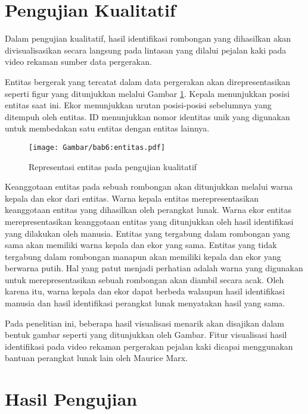 \section{Pengujian Kualitatif}
\label{sec:qualitative}

Dalam pengujian kualitatif, hasil identifikasi rombongan yang dihasilkan akan divisualisasikan secara langsung pada lintasan yang dilalui pejalan kaki pada video rekaman sumber data pergerakan.

Entitas bergerak yang tercatat dalam data pergerakan akan direpresentasikan seperti figur yang ditunjukkan melalui Gambar \ref{bab6:representasi-entitas}. Kepala menunjukkan posisi entitas saat ini. Ekor menunjukkan urutan posisi-posisi sebelumnya yang ditempuh oleh entitas. ID menunjukkan nomor identitas unik yang digunakan untuk membedakan satu entitas dengan entitas lainnya.

\begin{figure}[t]
    \centering
    \texttt{[image: Gambar/bab6:entitas.pdf]}
    \caption{Representasi entitas pada pengujian kualitatif}
    \label{bab6:representasi-entitas}
\end{figure}

Keanggotaan entitas pada sebuah rombongan akan ditunjukkan melalui warna kepala dan ekor dari entitas. Warna kepala entitas merepresentasikan keanggotaan entitas yang dihasilkan oleh perangkat lunak. Warna ekor entitas merepresentasikan keanggotaan entitas yang ditunjukkan oleh hasil identifikasi yang dilakukan oleh manusia. Entitas yang tergabung dalam rombongan yang sama akan memiliki warna kepala dan ekor yang sama. Entitas yang tidak tergabung dalam rombongan manapun akan memiliki kepala dan ekor yang berwarna putih. Hal yang patut menjadi perhatian adalah warna yang digunakan untuk merepresentasikan sebuah rombongan akan diambil secara acak. Oleh karena itu, warna kepala dan ekor dapat berbeda walaupun hasil identifikasi manusia dan hasil identifikasi perangkat lunak menyatakan hasil yang sama.

Pada penelitian ini, beberapa hasil visualisasi menarik akan disajikan dalam bentuk gambar seperti yang ditunjukkan oleh Gambar. Fitur visualisasi hasil identifikasi pada video rekaman pergerakan pejalan kaki dicapai menggunakan bantuan perangkat lunak lain oleh Maurice Marx.

\section{Hasil Pengujian}
\label{sec:result}

